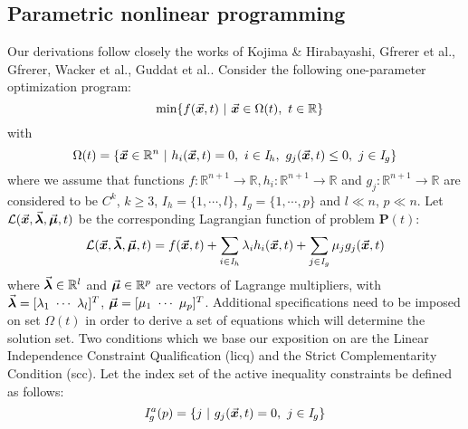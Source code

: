 \subsection{Parametric nonlinear programming}\label{CH4-S1SS3}

Our derivations follow
closely the works of Kojima \& Hirabayashi\cite{Kojima:1984}, Gfrerer et
al.\cite{Gfrerer:1983}, Gfrerer, Wacker et al.\cite{Gfrerer:1985}, Guddat et
al.\cite{Guddat:1990}.
Consider the following one-parameter optimization program:
\begin{equation}
	\hspace*{-4.5cm}\textbf{P}(t): \hspace*{3.8cm}\text{min}\{f(\bvec{x},t)\ |\
	\bvec{x}\in\Omega(t),\
	t\in\mathbb{R}\}
	\label{eq:PNLP}
\end{equation}
\noindent with
\begin{equation}
	\Omega(t)=\{\bvec{x}\in\mathbb{R}^n\ |\ h_i(\bvec{x},t)=0,\ 
	i\in\mathit{I}_h,\
	g_j(\bvec{x},t)\leq 0,\ j\in\mathit{I}_g\}
	\label{eq:ConstraintSet}
\end{equation}
\noindent where we assume that functions
$f:\mathbb{R}^{n+1}\rightarrow\mathbb{R},h_i:\mathbb{R}^{n+1}\rightarrow\mathbb{R}$
and $g_j:\mathbb{R}^{n+1}\rightarrow\mathbb{R}$  are considered to
be $C^k$, $k\geq 3$, $\mathit{I}_h=\{1,\cdots,l\}$,
$\mathit{I}_g=\{1,\cdots,p\}$ and $l\ll n$, $p\ll n$. Let
$\mathcal{L}(\vec{\bm{x}},\vec{\bm{\lambda}},\vec{\bm{\mu}},t)$ be the corresponding 
Lagrangian 
function of
problem \textbf{P}$(t)$:
\begin{equation}
	\mathcal{L}(\vec{\bm{x}},\vec{\bm{\lambda}},\vec{\bm{\mu}},t) =
	f(\vec{\bm{x}},t)+\sum_{i\in\mathit{I}_h}\lambda_ih_i(\vec{\bm{x}},t)+\sum_{j\in\mathit{I}_g}
	\mu_jg_j(\vec{\bm{x}},t)
	\label{eq:Lagrangian}
\end{equation}
\noindent where $\vec{\bm{\lambda}}\in\mathbb{R}^l$ and $\vec{\bm{\mu}}\in\mathbb{R}^p$ 
are vectors of
Lagrange multipliers, with $\bvec{\lambda}=	[\lambda_1 \ \cdots \ 
\lambda_l]^T$, 
$\bvec{\mu}=[\mu_1 \ \cdots \ \mu_p]^T$. 
Additional specifications need to be imposed on set $\Omega(t)$ in order to
derive a set of equations which will determine the solution set. Two 
conditions which we base our exposition on are the Linear Independence
Constraint Qualification (\acrshort{licq}) and the Strict Complementarity 
Condition (\acrshort{scc}). Let the index set of the active inequality 
constraints be defined as follows:
\begin{equation}
	\mathit{I}_g^a(p)=\{j\ |\ g_j(\bvec{x},t)=0,\ j\in\mathit{I}_g\}
	\label{eq:activeindex}
\end{equation}

